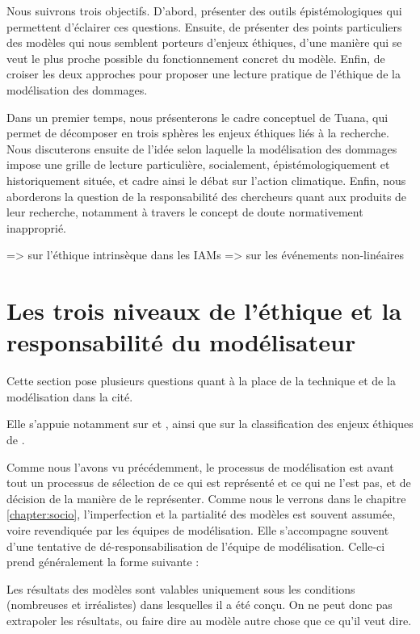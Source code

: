 Nous suivrons trois objectifs. D'abord, présenter des outils épistémologiques qui permettent d'éclairer ces questions. Ensuite, de présenter des points particuliers des modèles qui nous semblent porteurs d'enjeux éthiques, d'une manière qui se veut le plus proche possible du fonctionnement concret du modèle. Enfin, de croiser les deux approches pour proposer une lecture pratique de l'éthique de la modélisation des dommages. 

Dans un premier temps, nous présenterons le cadre conceptuel de Tuana, qui permet de décomposer en trois sphères les enjeux éthiques liés à la recherche. Nous discuterons ensuite de l'idée selon laquelle la modélisation des dommages impose une grille de lecture particulière, socialement, épistémologiquement et historiquement située, et cadre ainsi le débat sur l'action climatique. Enfin, nous aborderons la question de la responsabilité des chercheurs quant aux produits de leur recherche, notamment à travers le concept de doute normativement inapproprié. 





\cite{schienke_intrinsic_2011} => sur l'éthique intrinsèque dans les IAMs
\cite{weitzman_modeling_2009} => sur les événements non-linéaires



\section{Les trois niveaux de l'éthique et la responsabilité du modélisateur}

Cette section pose plusieurs questions quant à la place de la technique et de la modélisation dans la cité. 

Elle s'appuie notamment sur \cite{jonas_principe_2008} et \cite{edwards_vast_2013}, ainsi que sur la classification des enjeux éthiques de \cite{tuana_leading_2010}.


Comme nous l'avons vu précédemment, le processus de modélisation est avant tout un processus de sélection de ce qui est représenté et ce qui ne l'est pas, et de décision de la manière de le représenter. Comme nous le verrons dans le chapitre \ref{chapter:socio}, l'imperfection et la partialité des modèles est souvent assumée, voire revendiquée par les équipes de modélisation. Elle s'accompagne souvent d'une tentative de dé-responsabilisation de l'équipe de modélisation. Celle-ci prend généralement la forme suivante : 

\begin{authoredquote}
    Les résultats des modèles sont valables uniquement sous les conditions (nombreuses et irréalistes) dans lesquelles il a été conçu. On ne peut donc pas extrapoler les résultats, ou faire dire au modèle autre chose que ce qu'il veut dire. 
\end{authoredquote}

